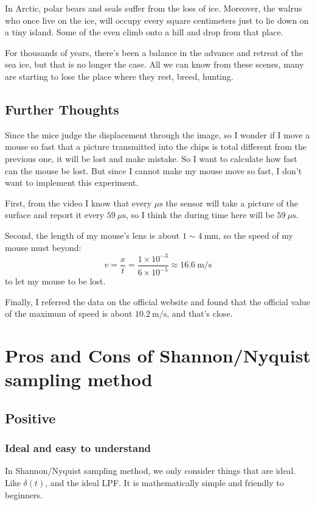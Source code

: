 \documentclass{article}
\begin{document}
In Arctic, polar bears and seals suffer from the loss of ice. Moreover, the walrus who once live on the ice, will occupy every square centimeters just to lie down on a tiny island. Some of the even climb onto a hill and drop from that place.

For thousands of years, there's been a balance in the advance and retreat of the sea ice, but that is no longer the case. All we can know from these scenes, many are starting to lose the place where they rest, breed, hunting.

\subsection{Further Thoughts}
Since the mice judge the displacement through the image, so I wonder if I move a mouse so fast that a picture transmitted into the chips is total different from the previous one, it will be lost and make mistake. So I want to calculate how fast can the mouse be lost. But since I cannot make my mouse move so fast, I don't want to implement this experiment.

First, from the video I know that every $\mu\mathrm{s}$ the sensor will take a picture of the surface and report it every $59 ~ \mu\mathrm{s}$, so I think the during time here will be $59 ~ \mu \mathrm{s}$. 

Second, the length of my mouse's lens is about $1 \sim 4 ~ \mathrm{mm}$, so the speed of my mouse must beyond:
$$
v = \frac{x}{t} = \frac{1 \times 10^{-3}}{6 \times 10^{-5}} \approx 16.6 ~\mathrm{m/s}
$$
to let my mouse to be lost.

Finally, I referred the data on the official website and found that the official value of the maximum of speed is about $10.2 ~\mathrm{m/s}$, and that's close.

\section{Pros and Cons of Shannon/Nyquist sampling method}
\subsection{Positive}
\subsubsection*{Ideal and easy to understand}
In Shannon/Nyquist sampling method, we only consider things that are ideal. Like $\delta(t)$, and the ideal LPF. It is mathematically simple and friendly to beginners.
\end{document}
